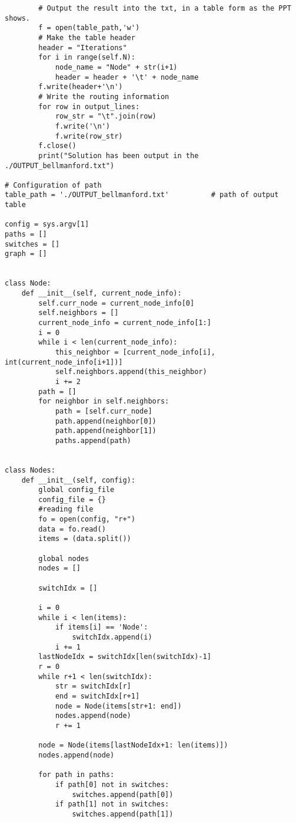 \documentclass[12pt]{article}
\begin{document}
\begin{verbatim}
        # Output the result into the txt, in a table form as the PPT shows.
        f = open(table_path,'w')
        # Make the table header
        header = "Iterations"
        for i in range(self.N):
            node_name = "Node" + str(i+1)
            header = header + '\t' + node_name
        f.write(header+'\n')
        # Write the routing information
        for row in output_lines:
            row_str = "\t".join(row)
            f.write('\n')
            f.write(row_str)
        f.close()
        print("Solution has been output in the ./OUTPUT_bellmanford.txt")

# Configuration of path
table_path = './OUTPUT_bellmanford.txt'          # path of output table

config = sys.argv[1]
paths = []
switches = []
graph = []


class Node:
    def __init__(self, current_node_info):
        self.curr_node = current_node_info[0]
        self.neighbors = []
        current_node_info = current_node_info[1:]
        i = 0
        while i < len(current_node_info):
            this_neighbor = [current_node_info[i], int(current_node_info[i+1])]
            self.neighbors.append(this_neighbor)
            i += 2
        path = []
        for neighbor in self.neighbors:
            path = [self.curr_node]
            path.append(neighbor[0])
            path.append(neighbor[1])
            paths.append(path)


class Nodes:
    def __init__(self, config):
        global config_file
        config_file = {}
        #reading file
        fo = open(config, "r+")
        data = fo.read()
        items = (data.split())

        global nodes
        nodes = []

        switchIdx = []

        i = 0
        while i < len(items):
            if items[i] == 'Node':
                switchIdx.append(i)
            i += 1
        lastNodeIdx = switchIdx[len(switchIdx)-1]
        r = 0
        while r+1 < len(switchIdx):
            str = switchIdx[r]
            end = switchIdx[r+1]
            node = Node(items[str+1: end])
            nodes.append(node)
            r += 1

        node = Node(items[lastNodeIdx+1: len(items)])
        nodes.append(node)

        for path in paths:
            if path[0] not in switches:
                switches.append(path[0])
            if path[1] not in switches:
                switches.append(path[1])



\end{verbatim}
\end{document}
